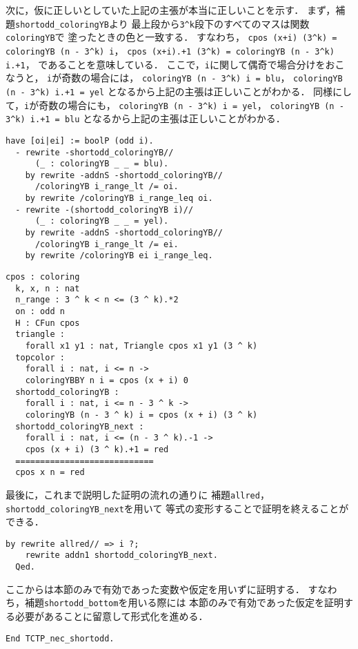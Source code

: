 次に，仮に正しいとしていた上記の主張が本当に正しいことを示す．
まず，補題{\tt{shortodd\_coloringYB}}より
最上段から{\tt{3\verb|^|k}}段下のすべてのマスは関数{\tt{coloringYB}}で
塗ったときの色と一致する．
すなわち，
{\tt{cpos (x+i) (3\verb|^|k) = coloringYB (n - 3\verb|^|k) i}}，
{\tt{cpos (x+i).+1 (3\verb|^|k) = coloringYB (n - 3\verb|^|k) i.+1}}，
であることを意味している．
ここで，{\tt{i}}に関して偶奇で場合分けをおこなうと，
{\tt{i}}が奇数の場合には，
{\tt{coloringYB (n - 3\verb|^|k) i = blu}}，
{\tt{coloringYB (n - 3\verb|^|k) i.+1 = yel}}
となるから上記の主張は正しいことがわかる．
同様にして，{\tt{i}}が奇数の場合にも，
{\tt{coloringYB (n - 3\verb|^|k) i = yel}}，
{\tt{coloringYB (n - 3\verb|^|k) i.+1 = blu}}
となるから上記の主張は正しいことがわかる．
\begin{lstlisting}[language=Coq]
  have [oi|ei] := boolP (odd i).
  - rewrite -shortodd_coloringYB//
      (_ : coloringYB _ _ = blu).
    by rewrite -addnS -shortodd_coloringYB//
      /coloringYB i_range_lt /= oi.
    by rewrite /coloringYB i_range_leq oi.    
  - rewrite -(shortodd_coloringYB i)//
      (_ : coloringYB _ _ = yel).
    by rewrite -addnS -shortodd_coloringYB//
      /coloringYB i_range_lt /= ei.
    by rewrite /coloringYB ei i_range_leq.
\end{lstlisting}
\begin{lstlisting}[language=Coq]
  cpos : coloring
  k, x, n : nat
  n_range : 3 ^ k < n <= (3 ^ k).*2
  on : odd n
  H : CFun cpos
  triangle :
    forall x1 y1 : nat, Triangle cpos x1 y1 (3 ^ k)
  topcolor :
    forall i : nat, i <= n ->
    coloringYBBY n i = cpos (x + i) 0
  shortodd_coloringYB :
    forall i : nat, i <= n - 3 ^ k ->
    coloringYB (n - 3 ^ k) i = cpos (x + i) (3 ^ k)
  shortodd_coloringYB_next :
    forall i : nat, i <= (n - 3 ^ k).-1 ->
    cpos (x + i) (3 ^ k).+1 = red
  ============================
  cpos x n = red
\end{lstlisting}
最後に，これまで説明した証明の流れの通りに
補題{\tt{allred}}，{\tt{shortodd\_coloringYB\_next}}を用いて
等式の変形することで証明を終えることができる．
\begin{lstlisting}[language=Coq]
    by rewrite allred// => i ?;
    rewrite addn1 shortodd_coloringYB_next.
  Qed.
\end{lstlisting}

ここからは本節のみで有効であった変数や仮定を用いずに証明する．
すなわち，補題{\tt{shortodd\_bottom}}を用いる際には
本節のみで有効であった仮定を証明する必要があることに留意して形式化を進める．
\begin{lstlisting}[language=Coq]
  End TCTP_nec_shortodd.
\end{lstlisting}

